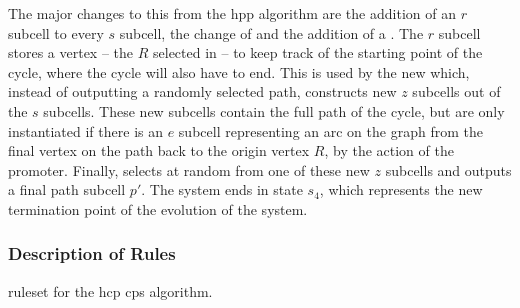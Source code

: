 The major changes to this from the \gls{hpp} algorithm are the addition of an \(r\) subcell to every \(s\) subcell, the change of  and the addition of a . The \(r\) subcell stores a vertex -- the \(R\) selected in  -- to keep track of the starting point of the cycle, where the cycle will also have to end.  This is used by the new  which, instead of outputting a randomly selected path, constructs new \(z\) subcells out of the \(s\) subcells.  These new subcells contain the full path of the cycle, but are only instantiated if there is an \(e\) subcell representing an arc on the graph from the final vertex on the path back to the origin vertex \(R\), by the action of the \gls{promoter}.  Finally,  selects at random from one of these new \(z\) subcells and outputs a final path subcell \(p'\).  The system ends in state \(s_4\), which represents the new termination point of the evolution of the system.

\subsubsection{Description of Rules}

\begin{cprulesetfloat}
    \begin{cpruleset}
        
        
        
        
        
        
    \end{cpruleset}
    \caption[\Gls{ruleset} for the ]{\label{ruleset:tsp:hcp}\Gls{ruleset} for the \gls{hcp} \gls{cps} algorithm.}
\end{cprulesetfloat}

